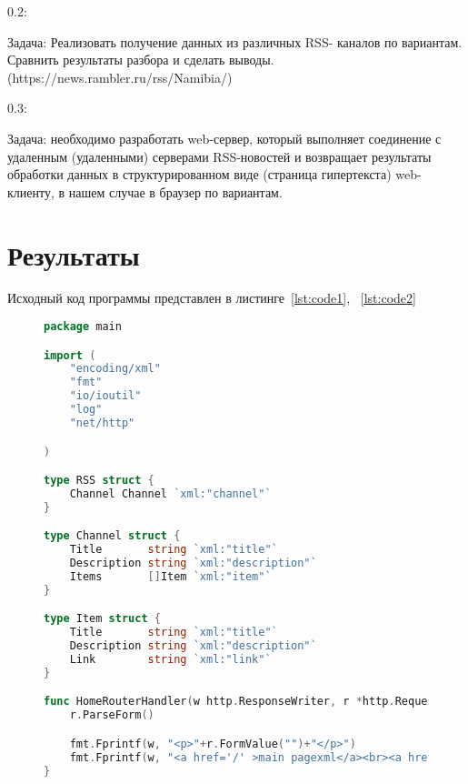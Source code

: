 \documentclass[a4paper, 14pt]{extarticle}
\begin{document}
    0.2:
    
    Задача: Реализовать получение данных из различных RSS- каналов по вариантам. Сравнить результаты разбора и сделать выводы.(https://news.rambler.ru/rss/Namibia/)
    
    0.3:
    
    Задача: необходимо разработать web-сервер, который выполняет соединение с удаленным (удаленными) серверами RSS-новостей и возвращает результаты обработки данных в структурированном виде (страница гипертекста) web-клиенту, в нашем случае в браузер по вариантам.

\section{Результаты}\label{Sect::res}

Исходный код программы представлен в листинге~\ref{lst:code1}, ~\ref{lst:code2}

\begin{figure}[!htb]
\begin{lstlisting}[language={go},caption={web.go},label={lst:code1}]
package main

import (
	"encoding/xml"
	"fmt" 
	"io/ioutil"
	"log"      
	"net/http" 

)

type RSS struct {
	Channel Channel `xml:"channel"`
}

type Channel struct {
	Title       string `xml:"title"`
	Description string `xml:"description"`
	Items       []Item `xml:"item"`
}

type Item struct {
	Title       string `xml:"title"`
	Description string `xml:"description"`
	Link        string `xml:"link"`
}

func HomeRouterHandler(w http.ResponseWriter, r *http.Request) {
	r.ParseForm() 

	fmt.Fprintf(w, "<p>"+r.FormValue("")+"</p>")
	fmt.Fprintf(w, "<a href='/' >main pagexml</a><br><a href='/rss' >rss</a><br><a href='/about'>about</a>") 
}
\end{lstlisting}
\end{figure}
\end{document}
